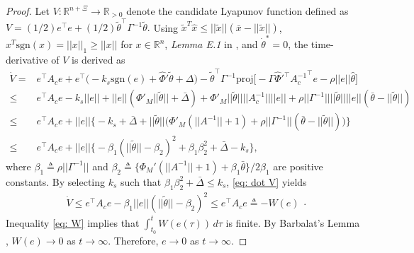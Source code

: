 \documentclass{l4dc2025}
\begin{document}
\begin{proof}
Let $V:\mathbb{R}^{n+\Xi}\to\mathbb{R}_{>0}$ denote the candidate Lyapunov function defined as 
$
    V={(1/2)}
    e^\top e
    +{(1/2)}\tilde \theta^\top  \Gamma^{-1}\tilde \theta.
$
Using $\tilde x^T\hat x\le||\tilde x||(\bar  x - ||\tilde x||)$, $x^T\text{sgn}(x)=||x||_1\ge ||x||$ for $x\in\mathbb{R}^n$, \textit{Lemma E.1} in \cite{BookProjection}, and $\dot \theta^*=0$, the time-derivative of $V$ is derived as 
\begin{equation}
    \begin{aligned}
        \dot V 
        =
        &
        e^\top  A_c e + 
        e^\top   
        \bigg( -k_s\text{sgn}(e)+\hat\Phi'\tilde \theta+\Delta
        \bigg)
        -\tilde\theta^\top   \Gamma^{-1} 
        \text{proj}
        \bigg[
            -\Gamma  \hat\Phi'^\top  {A_c^{-1}}^\top  e
            - \rho||e|| \hat \theta
        \bigg]
\\
\le &
        e^\top  A_c e -k_s ||e|| + ||e|| (\Phi'_M ||\tilde \theta||  +\bar\Delta ) 
        + \Phi'_M ||\tilde \theta||   ||A_c^{-1}|| ||e|| 
        +   \rho||\Gamma^{-1}||||\tilde\theta|| ||e|| (\bar\theta - ||\tilde \theta||)
\\
\le&
        e^\top  A_c e 
        +||e|| \bigg\{ 
         -k_s+        \bar\Delta
        +||\tilde \theta|| \bigg(\Phi'_M (||A^{-1}||+1) + \rho||\Gamma^{-1}|| (\bar\theta - ||\tilde \theta||) \bigg)
        \bigg\}
\\
\le&
        e^\top  A_c e +
        ||e|| 
        \bigg\{
         -\beta_1(||\tilde \theta ||-\beta_2)^2 + \beta_1\beta_2^2 + \bar\Delta -k_s 
        \bigg\},
       \end{aligned}
       \label{eq: dot V}
\end{equation}
where $\beta_1\triangleq\rho||\Gamma^{-1}||$ and $\beta_2 \triangleq \{\Phi_M' (||A^{-1}||+1) + \beta_1\bar\theta\}/2\beta_1$ are positive constants.
By selecting $k_s$ such that $\beta_1\beta_2^2+\bar\Delta \le k_s $, \eqref{eq: dot V} yields 
\begin{equation}
    \begin{aligned}
        \dot V \le e^\top  A_c e  -\beta_1||e||(||\tilde\theta||-\beta_2)^2\le
        e^\top  A_c e \triangleq -W(e) 
    \end{aligned}.\label{eq: W}
\end{equation}
Inequality \eqref{eq: W} implies that $\int_{{t_0}}^t {W(e(\tau ))} \,d\tau $ is finite. By Barbalat's Lemma \cite{Khalil}, $W(e) \to 0$ as $t \to \infty$. Therefore, $e\to 0$ as $t\to\infty$. 
\end{proof}
\end{document}
